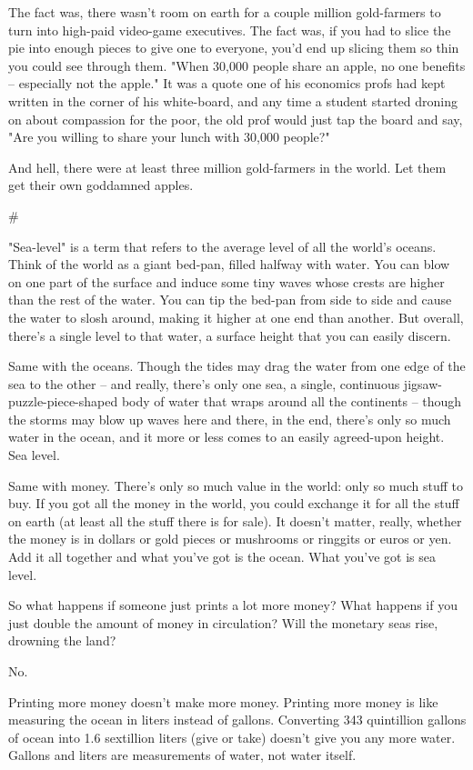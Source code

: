 The fact was, there wasn't room on earth for a couple million
gold-farmers to turn into high-paid video-game executives. The fact
was, if you had to slice the pie into enough pieces to give one to
everyone, you'd end up slicing them so thin you could see through
them. "When 30,000 people share an apple, no one benefits --
especially not the apple." It was a quote one of his economics
profs had kept written in the corner of his white-board, and any
time a student started droning on about compassion for the poor,
the old prof would just tap the board and say, "Are you willing to
share your lunch with 30,000 people?"

And hell, there were at least three million gold-farmers in the
world. Let them get their own goddamned apples.

\#

"Sea-level" is a term that refers to the average level of all the
world's oceans. Think of the world as a giant bed-pan, filled
halfway with water. You can blow on one part of the surface and
induce some tiny waves whose crests are higher than the rest of the
water. You can tip the bed-pan from side to side and cause the
water to slosh around, making it higher at one end than another.
But overall, there's a single level to that water, a surface height
that you can easily discern.

Same with the oceans. Though the tides may drag the water from one
edge of the sea to the other -- and really, there's only one sea, a
single, continuous jigsaw-puzzle-piece-shaped body of water that
wraps around all the continents -- though the storms may blow up
waves here and there, in the end, there's only so much water in the
ocean, and it more or less comes to an easily agreed-upon height.
Sea level.

Same with money. There's only so much value in the world: only so
much stuff to buy. If you got all the money in the world, you could
exchange it for all the stuff on earth (at least all the stuff
there is for sale). It doesn't matter, really, whether the money is
in dollars or gold pieces or mushrooms or ringgits or euros or yen.
Add it all together and what you've got is the ocean. What you've
got is sea level.

So what happens if someone just prints a lot more money? What
happens if you just double the amount of money in circulation? Will
the monetary seas rise, drowning the land?

No.

Printing more money doesn't make more money. Printing more money is
like measuring the ocean in liters instead of gallons. Converting
343 quintillion gallons of ocean into 1.6 sextillion liters (give
or take) doesn't give you any more water. Gallons and liters are
measurements of water, not water itself.

